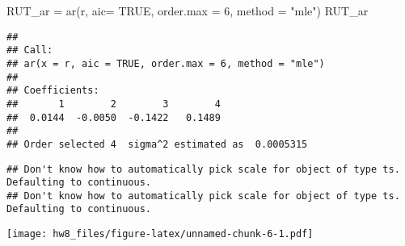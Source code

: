 \documentclass[
]{article}
\newenvironment{Shaded}{\begin{snugshade}}{\end{snugshade}}
\newcommand{\AttributeTok}[1]{\textcolor[rgb]{0.77,0.63,0.00}{#1}}
\newcommand{\CommentTok}[1]{\textcolor[rgb]{0.56,0.35,0.01}{\textit{#1}}}
\newcommand{\ConstantTok}[1]{\textcolor[rgb]{0.00,0.00,0.00}{#1}}
\newcommand{\DecValTok}[1]{\textcolor[rgb]{0.00,0.00,0.81}{#1}}
\newcommand{\FunctionTok}[1]{\textcolor[rgb]{0.00,0.00,0.00}{#1}}
\newcommand{\NormalTok}[1]{#1}
\newcommand{\OtherTok}[1]{\textcolor[rgb]{0.56,0.35,0.01}{#1}}
\newcommand{\SpecialCharTok}[1]{\textcolor[rgb]{0.00,0.00,0.00}{#1}}
\newcommand{\StringTok}[1]{\textcolor[rgb]{0.31,0.60,0.02}{#1}}
\begin{document}
\begin{Shaded}
\begin{Highlighting}[]
\NormalTok{RUT\_ar }\OtherTok{=} \FunctionTok{ar}\NormalTok{(r, }\AttributeTok{aic=} \ConstantTok{TRUE}\NormalTok{, }\AttributeTok{order.max =} \DecValTok{6}\NormalTok{, }\AttributeTok{method =} \StringTok{"mle"}\NormalTok{)}
\NormalTok{RUT\_ar}
\end{Highlighting}
\end{Shaded}

\begin{verbatim}
## 
## Call:
## ar(x = r, aic = TRUE, order.max = 6, method = "mle")
## 
## Coefficients:
##       1        2        3        4  
##  0.0144  -0.0050  -0.1422   0.1489  
## 
## Order selected 4  sigma^2 estimated as  0.0005315
\end{verbatim}

\begin{Shaded}
\end{Shaded}

\begin{verbatim}
## Don't know how to automatically pick scale for object of type ts. Defaulting to continuous.
## Don't know how to automatically pick scale for object of type ts. Defaulting to continuous.
\end{verbatim}

\texttt{[image: hw8\_files/figure-latex/unnamed-chunk-6-1.pdf]}
\end{document}
